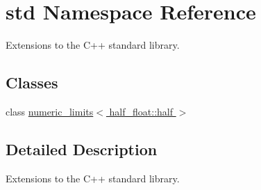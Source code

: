 \hypertarget{namespacestd}{}\section{std Namespace Reference}
\label{namespacestd}


Extensions to the C++ standard library.  


\subsection*{Classes}
\begin{DoxyCompactItemize}
\item 
class \hyperlink{classstd_1_1numeric__limits_3_01half__float_1_1half_01_4}{numeric\+\_\+limits$<$ half\+\_\+float\+::half $>$}
\end{DoxyCompactItemize}


\subsection{Detailed Description}
Extensions to the C++ standard library. 